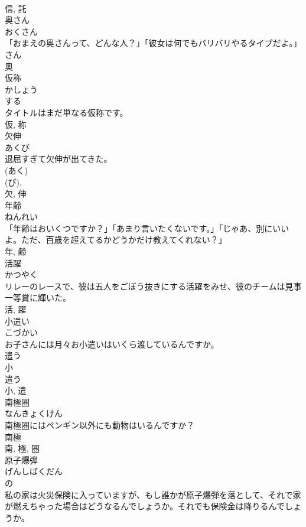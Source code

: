 \documentclass[8pt]{extreport}
\begin{document}
\begin{CJK}{UTF8}{min}
\\	信, 託	
\\	奥さん	
\\	おくさん	
\\	「おまえの奥さんって、どんな人？」「彼女は何でもバリバリやるタイプだよ。」	
\\	さん 
\\	奥	
\\	仮称	
\\	かしょう	
\\	する 
\\	タイトルはまだ単なる仮称です。	
\\	仮, 称	
\\	欠伸	
\\	あくび	
\\	退屈すぎて欠伸が出てきた。	
\\	(あく) 
\\	(び). 
\\	欠, 伸	
\\	年齢	
\\	ねんれい	
\\	「年齢はおいくつですか？」「あまり言いたくないです。」「じゃあ、別にいいよ。ただ、百歳を超えてるかどうかだけ教えてくれない？」	
\\	年, 齢	
\\	活躍	
\\	かつやく	
\\	リレーのレースで、彼は五人をごぼう抜きにする活躍をみせ、彼のチームは見事一等賞に輝いた。	
\\	活, 躍	
\\	小遣い	
\\	こづかい	
\\	お子さんには月々お小遣いはいくら渡しているんですか。	
\\	遣う 
\\	小 
\\	遣う
\\	小, 遣	
\\	南極圏	
\\	なんきょくけん	
\\	南極圏にはペンギン以外にも動物はいるんですか？	
\\	南極 
\\	南, 極, 圏	
\\	原子爆弾	
\\	げんしばくだん	
\\	の 
\\	私の家は火災保険に入っていますが、もし誰かが原子爆弾を落として、それで家が燃えちゃった場合はどうなるんでしょうか。それでも保険金は降りるんでしょうか。	

\end{CJK}
\end{document}
